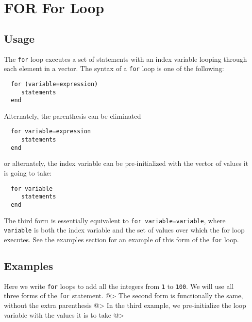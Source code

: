\section{FOR For Loop}

\subsection{Usage}

The \verb|for| loop executes a set of statements with an 
index variable looping through each element in a vector.
The syntax of a \verb|for| loop is one of the following:
\begin{verbatim}
  for (variable=expression)
     statements
  end
\end{verbatim}
Alternately, the parenthesis can be eliminated
\begin{verbatim}
  for variable=expression
     statements
  end
\end{verbatim}
or alternately, the index variable can be pre-initialized
with the vector of values it is going to take:
\begin{verbatim}
  for variable
     statements
  end
\end{verbatim}
The third form is essentially equivalent to \verb|for variable=variable|,
where \verb|variable| is both the index variable and the set of values
over which the for loop executes.  See the examples section for
an example of this form of the \verb|for| loop.
\subsection{Examples}

Here we write \verb|for| loops to add all the integers from
\verb|1| to \verb|100|.  We will use all three forms of the \verb|for|
statement.
@>
The second form is functionally the same, without the
extra parenthesis
@>
In the third example, we pre-initialize the loop variable
with the values it is to take
@>
